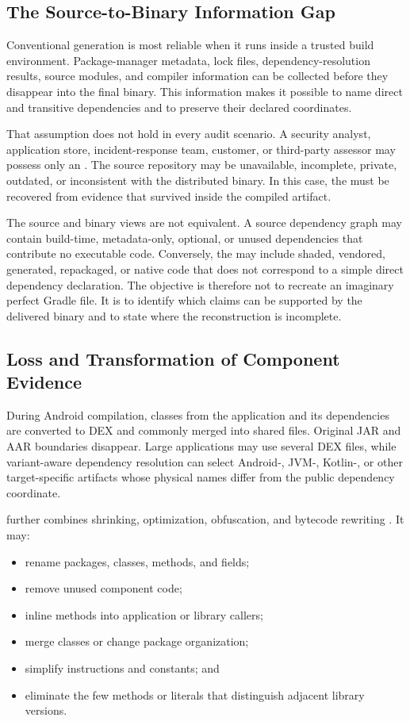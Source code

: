 \subsection{The Source-to-Binary Information Gap}

Conventional \SBOM generation is most reliable when it runs inside a trusted
build environment. Package-manager metadata, lock files, dependency-resolution
results, source modules, and compiler information can be collected before
they disappear into the final binary. This information makes it possible to
name direct and transitive dependencies and to preserve their declared
coordinates.

That assumption does not hold in every audit scenario. A security analyst,
application store, incident-response team, customer, or third-party assessor
may possess only an \APK. The source repository may be unavailable,
incomplete, private, outdated, or inconsistent with the distributed binary.
In this case, the \SBOM must be recovered from evidence that survived inside
the compiled artifact.

The source and binary views are not equivalent. A source dependency graph may
contain build-time, metadata-only, optional, or unused dependencies that
contribute no executable code. Conversely, the \APK may include shaded,
vendored, generated, repackaged, or native code that does not correspond to a
simple direct dependency declaration. The objective is therefore not to
recreate an imaginary perfect Gradle file. It is to identify which claims can
be supported by the delivered binary and to state where the reconstruction is
incomplete.

\subsection{Loss and Transformation of Component Evidence}

During Android compilation, classes from the application and its dependencies
are converted to DEX and commonly merged into shared files. Original JAR and
AAR boundaries disappear. Large applications may use several DEX files, while
variant-aware dependency resolution can select Android-, JVM-, Kotlin-, or
other target-specific artifacts whose physical names differ from the public
dependency coordinate.

\Reight further combines shrinking, optimization, obfuscation, and bytecode
rewriting \cite{androidShrinkCode}. It may:

\begin{itemize}
  \item rename packages, classes, methods, and fields;
  \item remove unused component code;
  \item inline methods into application or library callers;
  \item merge classes or change package organization;
  \item simplify instructions and constants; and
  \item eliminate the few methods or literals that distinguish adjacent
  library versions.
\end{itemize}

